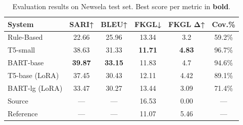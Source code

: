 \begin{table}[h]
\centering
\caption{Evaluation results on Newsela test set. Best score per metric in \textbf{bold}.}
\label{tab:results}
\begin{tabular}{lccccc}
\toprule
\textbf{System} & \textbf{SARI}↑ & \textbf{BLEU}↑ & \textbf{FKGL}↓ & \textbf{FKGL Δ}↑ & \textbf{Cov.\%} \\
\midrule
Rule-Based & 22.66 & 25.96 & 13.34 & 3.2 & 59.2\% \\
T5-small & 38.63 & 31.33 & \textbf{11.71} & \textbf{4.83} & 96.7\% \\
BART-base & \textbf{39.87} & \textbf{33.15} & 11.83 & 4.7 & 94.6\% \\
T5-base (LoRA) & 37.45 & 30.43 & 12.11 & 4.42 & 89.1\% \\
BART-lg (LoRA) & 33.47 & 30.27 & 13.44 & 3.09 & 71.4\% \\
\midrule
Source & — & — & 16.53 & 0.00 & — \\
Reference & — & — & 11.07 & 5.46 & — \\
\bottomrule
\end{tabular}
\end{table}